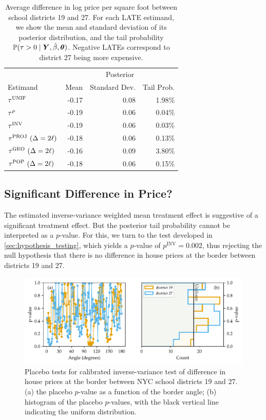 \begin{table}
    \centering
    \begin{tabular}{lrrr}
        \hline
        & \multicolumn{3}{c}{Posterior} \\
        Estimand & Mean & Standard Dev. & Tail Prob. \\
        \hline
	      \(\tau^{\mathrm{UNIF}}\) & -0.17 & 0.08 & 1.98\% \\
	      \(\tau^{\rho}\) & -0.19 & 0.06 & 0.04\% \\
	      \(\tau^{\mathrm{INV}}\) & -0.19 & 0.06 & 0.03\% \\
	      \(\tau^{\mathrm{PROJ}}~(\Delta=2\ell)\) & -0.18 & 0.06 & 0.13\% \\
		  \(\tau^{\mathrm{GEO}}~(\Delta=2\ell)\) & -0.16 & 0.09 & 3.80\% \\
		  \(\tau^{\mathrm{POP}}~(\Delta=2\ell)\) & -0.18 & 0.06 & 0.15\% \\
        \hline
    \end{tabular}
    \caption{
    \label{table:NYC_ate}
Average difference in log price per square foot between school districts 19 and 27. For each LATE estimand, we show the mean and standard deviation of its posterior distribution, and the tail probability \(\operatorname{\mathbb{P}}(\tau > 0 \mid \bm{Y}, \hat{\beta}, \bm{\theta})\). 
Negative LATEs correspond to district 27 being more expensive.
}
\end{table}

\subsection{Significant Difference in Price?}
The estimated inverse-variance weighted mean treatment effect is suggestive of a significant treatment effect.
But the posterior tail probability cannot be interpreted as a \(p\)-value.
For this, we turn to the test developed in \autoref{sec:hypothesis_testing}, which yields a \(p\)-value of \(p^{\mathrm{INV}}=0.002\), thus rejecting the null hypothesis that there is no difference in house prices at the border between districts 19 and 27.

\begin{figure}[tb]
    \centering
    \includegraphics[width=\textwidth,height=0.3\textheight,keepaspectratio]{figures/placebo_invvar.pdf}
    \caption{\label{fig:placebo_invvar} Placebo tests for calibrated inverse-variance test of difference in house prices at the border between NYC school districts 19 and 27. 
    (a) the placebo \(p\)-value as a function of the border angle;
    (b) histogram of the placebo \(p\)-values, with the black vertical line indicating the uniform distribution.}
\end{figure}

